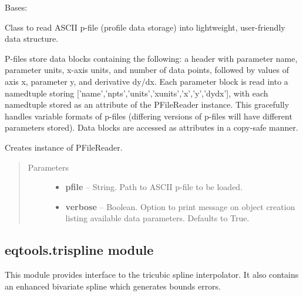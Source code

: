 \documentclass[letterpaper,10pt,english]{sphinxmanual}
\begin{document}
\begin{fulllineitems}
\label{eqtools:eqtools.pfilereader.PFileReader}
Bases: 

Class to read ASCII p-file (profile data storage) into lightweight, user-friendly data structure.

P-files store data blocks containing the following: a header with parameter
name, parameter units, x-axis units, and number of data points, followed by values of
axis x, parameter y, and derivative dy/dx.  Each parameter block is read into a
namedtuple storing {[}'name','npts','units','xunits','x','y','dydx'{]}, with each namedtuple
stored as an attribute of the PFileReader instance.  This gracefully handles variable
formats of p-files (differing versions of p-files will have different parameters stored).
Data blocks are accessed as attributes in a copy-safe manner.

Creates instance of PFileReader.
\begin{quote}\begin{description}
\item[{Parameters}] \leavevmode\begin{itemize}
\item {} 
\textbf{pfile} -- String.
Path to ASCII p-file to be loaded.

\item {} 
\textbf{verbose} -- Boolean.
Option to print message on object creation listing available data
parameters. Defaults to True.

\end{itemize}

\end{description}\end{quote}

\end{fulllineitems}



\subsection{eqtools.trispline module}
\label{eqtools:eqtools-trispline-module}\label{eqtools:module-eqtools.trispline}
This module provides interface to the tricubic spline interpolator. It also
contains an enhanced bivariate spline which generates bounds errors.
\end{document}
